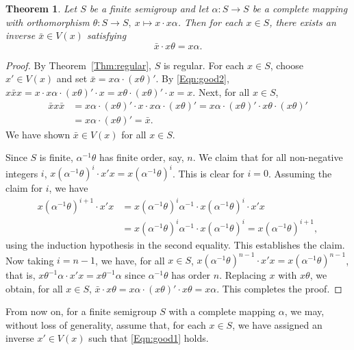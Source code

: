 \documentclass[11pt]{article}
\theoremstyle{plain}
\newtheorem{theorem}{Theorem}[section]
\theoremstyle{remark}
\theoremstyle{definition}
\theoremstyle{plain}
\newcommand{\inv}{^{-1}}
\begin{document}
\begin{theorem}\label{Thm:good_inverse}
Let $S$ be a finite semigroup and let $\alpha\colon S\to S$ be a complete mapping with orthomorphism $\theta\colon S\to S,\ x\mapsto x\cdot x\alpha$. Then for each $x\in S$, there exists an inverse $\bar{x}\in V(x)$ satisfying
\begin{equation}\label{Eqn:good1}
    \bar{x}\cdot x\theta = x\alpha.
\end{equation}
\end{theorem}
\begin{proof}
By Theorem~\ref{Thm:regular}, $S$ is regular. For each $x\in S$, choose $x'\in V(x)$ and set $\bar{x} = x\alpha\cdot (x\theta)'$. By \eqref{Eqn:good2},
\(x \bar{x} x = x\cdot x\alpha\cdot (x\theta)'\cdot x = x\theta\cdot (x\theta)'\cdot x = x.\)
Next, for all $x\in S$,
\begin{align*}
    \bar{x}x\bar{x} &= x\alpha\cdot (x\theta)'\cdot x\cdot x\alpha\cdot (x\theta)' = x\alpha\cdot (x\theta)'\cdot x\theta\cdot (x\theta)' \\
    &= x\alpha\cdot (x\theta)' = \bar{x}.
\end{align*}
We have shown $\bar{x}\in V(x)$ for all $x\in S$.

Since $S$ is finite, $\alpha\inv\theta$ has finite order, say, $n$.
We claim that for all non-negative integers $i$, $x(\alpha\inv\theta)^i\cdot x'x = x(\alpha\inv\theta)^i$. This is clear for $i=0$. Assuming the claim for $i$,
we have
\begin{align*}
x(\alpha\inv\theta)^{i+1}\cdot x'x &= x(\alpha\inv\theta)^i\alpha\inv\cdot x(\alpha\inv\theta)^i\cdot x'x \\
&= x(\alpha\inv\theta)^i\alpha\inv\cdot x(\alpha\inv\theta)^i = x(\alpha\inv\theta)^{i+1},
\end{align*}
using the induction hypothesis in the second equality. This establishes the claim. Now taking $i=n-1$, we have, for all $x\in S$,
$x(\alpha\inv\theta)^{n-1}\cdot x'x = x(\alpha\inv\theta)^{n-1}$, that is,
$x\theta\inv\alpha \cdot x'x = x\theta\inv\alpha$ since $\alpha\inv\theta$ has order $n$. Replacing $x$ with $x\theta$, we obtain,
for all $x\in S$,
\(\bar{x}\cdot x\theta = x\alpha\cdot (x\theta)'\cdot {x\theta} = x\alpha.\)
This completes the proof.
\end{proof}

From now on, for a finite semigroup $S$ with a complete mapping $\alpha$, we may, without loss of generality, assume that, for each $x\in S$,
we have assigned an inverse $x'\in V(x)$ such that \eqref{Eqn:good1} holds.
\end{document}
